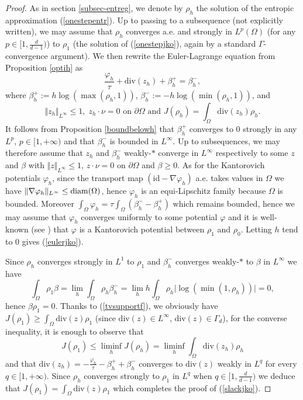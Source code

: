 \documentclass[12pt, a4paper]{article}
\numberwithin{equation}{section}
\theoremstyle{plain}
\theoremstyle{definition}
\theoremstyle{remark}
\newcommand{\id}{\mathrm{id}}
\newcommand{\dive}{\mathrm{div}}
\newcommand\pref[1]{(\ref{#1})}
\begin{document}
\begin{proof}
As in section \ref{subsec-entreg}, we denote by $\rho_h$ the solution of the entropic approximation \pref{onestepentr}. Up to passing to a subsequence (not explicitly written),  we may assume that $\rho_h$ converges a.e. and strongly in $L^p(\Omega)$ (for any $p\in [1, \frac{d}{d-1})$) to $\rho_1$ (the solution of \pref{onestepjko}, again by a standard $\Gamma$-convergence argument). We then rewrite the Euler-Lagrange equation from Proposition \ref{optih} as
\begin{equation}
\frac{\varphi_h}{\tau}+ \dive(z_h)+ \beta_h^+=\beta_h^-, 
\end{equation}
where $\beta_h^+:=h\log(\max(\rho_h, 1))$, $\beta_h^-:=-h\log(\min(\rho_h, 1))$,
and 
\begin{equation}
\Vert z_h \Vert_{L^{\infty}}\le 1, \; z_h \cdot \nu=0 \mbox{ on $\partial \Omega$ and } J(\rho_h)=\int_{\Omega} \dive(z_h) \rho_h.
\end{equation}
It follows from Proposition \ref{boundbelowh}  that $\beta_h^+$ converges to $0$ strongly in any $L^p$, $p\in [1, +\infty)$ and  that $\beta_h^-$ is bounded in $L^{\infty}$. Up to subsequences, we may therefore assume that $z_h$ and $\beta_h^-$ weakly-$*$ converge in $L^{\infty}$ respectively to some  $z$ and $\beta$ with $\Vert z \Vert_{L^{\infty}}\le 1$, $z\cdot \nu=0$ on $\partial \Omega$ and $\beta \ge 0$. As for the Kantorovich potentials $\varphi_h$,  since the transport map $(\id-\nabla \varphi_h)$ a.e. takes values in $\Omega$ we have $\Vert \nabla \varphi_h \Vert_{L^{\infty}} \le {\rm{diam}}(\Omega)$, hence  $\varphi_h$ is an equi-Lipschitz family because $\Omega$ is bounded. Moreover $\int_{\Omega} \varphi_h=\tau \int_{\Omega} (\beta_h^- -\beta_h^+)$ which remains bounded, hence we may assume that $\varphi_h$ converges uniformly to some potential $\varphi$ and it is well-known (see \cite{santambrogio2015optimal}) that $\varphi$ is a Kantorovich potential between $\rho_1$ and $\rho_0$. Letting $h$ tend to $0$ gives \pref{eulerjko}. 


\smallskip

Since $\rho_h$ converges strongly in $L^1$ to $\rho_1$ and $\beta_h^{-}$ converges weakly-$*$ to $\beta$ in $L^{\infty}$ we have
\[\int_{\Omega} \rho_1 \beta=\lim_h \int_{\Omega} \rho_h \beta_h^{-} = \lim_h h\int_{\Omega} \rho_h  \vert \log(\min (1, \rho_h))\vert=0, \]
hence $\beta \rho_1=0$. Thanks to \pref{tvsupportf}, we obviously have $J(\rho_1)\ge \int_{\Omega} \dive(z) \rho_1$ (since $\dive(z)\in L^{\infty}$,  $\dive(z)\in \Gamma_d$), for the converse inequality, it is enough to observe that
\[J(\rho_1)\le \liminf_h J(\rho_h)=\liminf_h \int_{\Omega} \dive(z_h) \rho_h\]
and that $\dive(z_h)=-\frac{\varphi_h}{\tau}-\beta_h^++ \beta_h^{-}$ converges to $\dive(z)$ weakly in $L^q$ for every $q\in [1, +\infty)$. Since $\rho_h$ converges strongly to $\rho_1$ in $L^q$ when $q\in [1, \frac{d}{d-1})$ we deduce that $J(\rho_1)=\int_{\Omega} \dive(z) \rho_1$ which completes the proof of \pref{slackjko}.  


\end{proof}
\end{document}
